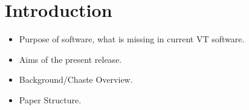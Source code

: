 \documentclass[superscriptaddress, a4paper]{article}
\begin{document}
\section{Introduction}
\label{sec:introduction}

\begin{itemize}
 \item Purpose of software, what is missing in current VT software.
 \item Aims of the present release. 
 \item Background/Chaste Overview. 
 \item Paper Structure. 
\end{itemize}

\end{document}
